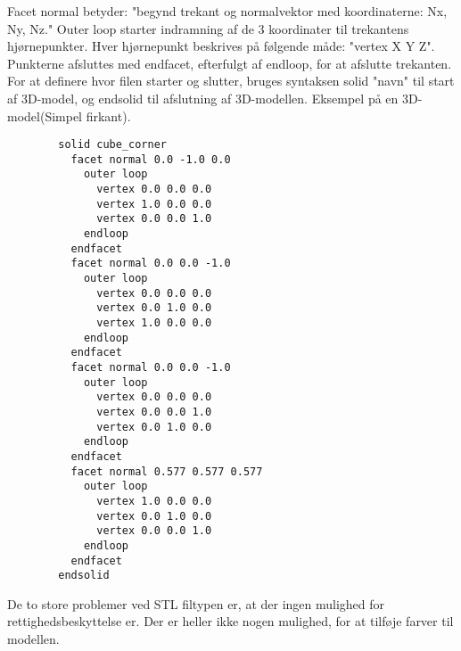 Facet normal betyder: "begynd trekant og normalvektor med koordinaterne: Nx, Ny, Nz." Outer loop starter indramning af de 3 koordinater til trekantens hjørnepunkter. Hver hjørnepunkt beskrives på følgende måde: "vertex X Y Z". Punkterne afsluttes med endfacet, efterfulgt af endloop, for at afslutte trekanten. 
For at definere hvor filen starter og slutter, bruges syntaksen solid "navn"  til start af 3D-model, og endsolid til afslutning af 3D-modellen.
Eksempel på en 3D-model(Simpel firkant)\autocite{Stl_Eksempel}.
\begin{lstlisting}
        solid cube_corner
          facet normal 0.0 -1.0 0.0
            outer loop
              vertex 0.0 0.0 0.0
              vertex 1.0 0.0 0.0
              vertex 0.0 0.0 1.0
            endloop
          endfacet
          facet normal 0.0 0.0 -1.0
            outer loop
              vertex 0.0 0.0 0.0
              vertex 0.0 1.0 0.0
              vertex 1.0 0.0 0.0
            endloop
          endfacet
          facet normal 0.0 0.0 -1.0
            outer loop
              vertex 0.0 0.0 0.0
              vertex 0.0 0.0 1.0
              vertex 0.0 1.0 0.0
            endloop
          endfacet
          facet normal 0.577 0.577 0.577
            outer loop
              vertex 1.0 0.0 0.0
              vertex 0.0 1.0 0.0
              vertex 0.0 0.0 1.0
            endloop
          endfacet
        endsolid
\end{lstlisting}
De to store problemer ved STL filtypen er, at der ingen mulighed for rettighedsbeskyttelse er. Der er heller ikke nogen mulighed, for at tilføje farver til modellen.